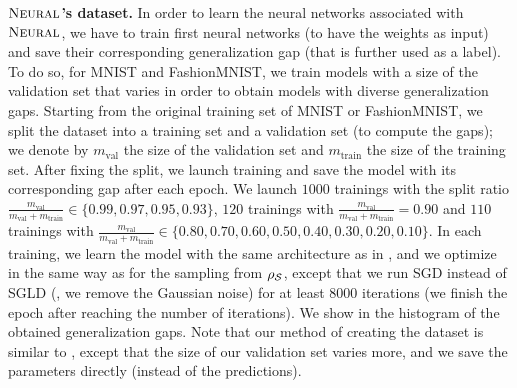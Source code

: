 \documentclass[twoside]{article}
\theoremstyle{plain}
\begin{document}
\textbf{$\text{\sc Neural}$'s dataset.} In order to learn the neural networks associated with $\text{\sc Neural}$, we have to train first neural networks (to have the weights as input) and save their corresponding generalization gap (that is further used as a label).
To do so, for MNIST and FashionMNIST, we train models with a size of the validation set that varies in order to obtain models with diverse generalization gaps.
Starting from the original training set of MNIST or FashionMNIST, we split the dataset into a training set and a validation set (to compute the gaps); we denote by $m_{\text{val}}$ the size of the validation set and $m_{\text{train}}$ the size of the training set.
After fixing the split, we launch training and save the model with its corresponding gap after each epoch. 
We launch $1000$ trainings with the split ratio $\frac{m_{\text{val}}}{m_{\text{val}}+m_{\text{train}}} \in \{ 0.99, 0.97, 0.95, 0.93 \}$, $120$ trainings with $\frac{m_{\text{val}}}{m_{\text{val}}+m_{\text{train}}}=0.90$ and $110$ trainings with $\frac{m_{\text{val}}}{m_{\text{val}}+m_{\text{train}}}\in\{ 0.80, 0.70, 0.60, 0.50, 0.40, 0.30, 0.20, 0.10\}$.
In each training, we learn the model with the same architecture as in , and we optimize in the same way as for the sampling from $\rho_{\mathcal{S}}$, except that we run SGD instead of SGLD (\ie, we remove the Gaussian noise) for at least 8000 iterations (we finish the epoch after reaching the number of iterations).
We show in  the histogram of the obtained generalization gaps.
Note that our method of creating the dataset is similar to \citet{lee2020neural}, except that the size of our validation set varies more, and we save the parameters directly (instead of the predictions).
\end{document}
